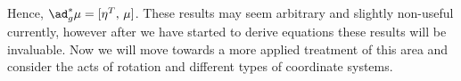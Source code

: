 Hence, $\ad_g^*\mu = [\eta^T,\,\mu]$. These results may seem arbitrary and slightly non-useful currently, however after we have started to derive equations these results will be invaluable. Now we will move towards a more applied treatment of this area and consider the acts of rotation and different types of coordinate systems.

